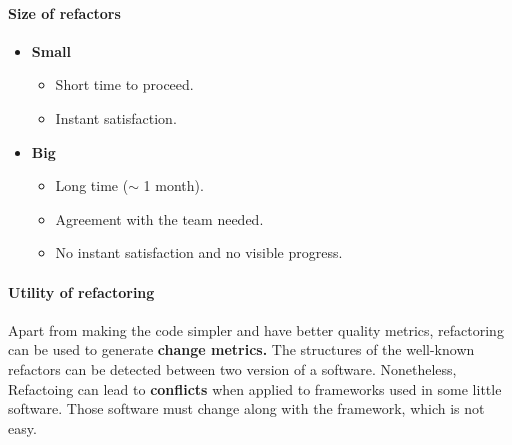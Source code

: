 \documentclass[a4paper,11pt]{report}
\begin{document}
		\paragraph{Size of refactors}
			\begin{itemize}
				\setlength{\itemsep}{0pt}
				\setlength{\parskip}{0pt}
				\setlength{\parsep}{0pt}
				\item \textbf{Small}
					\begin{itemize}
						\setlength{\itemsep}{0pt}
						\setlength{\parskip}{0pt}
						\setlength{\parsep}{0pt}
						\item Short time to proceed.
						\item Instant satisfaction.
					\end{itemize}
				\item \textbf{Big}
					\begin{itemize}
						\setlength{\itemsep}{0pt}
						\setlength{\parskip}{0pt}
						\setlength{\parsep}{0pt}
						\item Long time ($\sim$ 1 month).
						\item Agreement with the team
							needed.
						\item No instant satisfaction and
							no visible progress.
					\end{itemize}
			\end{itemize}
		\paragraph{Utility of refactoring}
			Apart from making the code simpler and 
				have better quality metrics, 
				refactoring can be used to generate
				\textbf{change metrics.} The structures of
				the well-known refactors can be detected
				between two version of a software.
				Nonetheless, Refactoing can lead to 
				\textbf{conflicts} when applied to
				frameworks used in some little software.
				Those software must change along with
				the framework, which is not easy.
\end{document}
